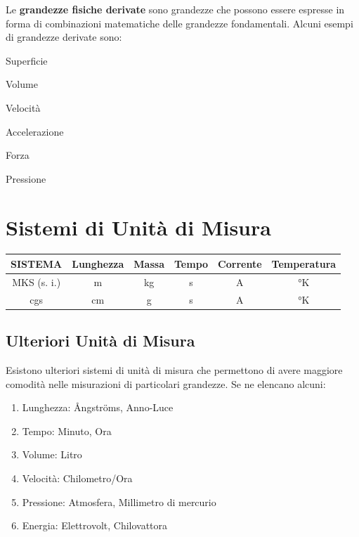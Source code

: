 \documentclass[12pt,oneside]{book}
\begin{document}
\noindent Le \textbf{grandezze fisiche derivate} sono grandezze che possono essere
espresse in forma di combinazioni matematiche delle grandezze fondamentali.
Alcuni esempi di grandezze derivate sono:
\begin{itemize}
    \begin{multicols}{2}
        \item Superficie
        \item Volume
        \item Velocità
        \item Accelerazione
        \item Forza
        \item Pressione
    \end{multicols}
\end{itemize}

\section{Sistemi di Unità di Misura}
\begin{center}
    \bgroup
    \def\arraystretch{1.5}
    \begin{tabular}{ |c| c c c c c|}
        \hline
        SISTEMA     & Lunghezza & Massa & Tempo & Corrente & Temperatura \\
        \hline
        MKS (s. i.) & m         & kg    & s     & A        & °K          \\
        \hline
        cgs         & cm        & g     & s     & A        & °K          \\
        \hline
    \end{tabular}
    \egroup
\end{center}

\subsection{Ulteriori Unità di Misura}
Esistono ulteriori sistemi di unità di misura che permettono di avere maggiore comodità
nelle misurazioni di particolari grandezze.
Se ne elencano alcuni:

\begin{enumerate}
    \item Lunghezza:    \tabto{3cm} Ångströms, Anno-Luce
    \item Tempo:        \tabto{3cm} Minuto, Ora
    \item Volume:       \tabto{3cm} Litro
    \item Velocità:     \tabto{3cm} Chilometro/Ora
    \item Pressione:    \tabto{3cm} Atmosfera, Millimetro di mercurio
    \item Energia:      \tabto{3cm} Elettrovolt, Chilovattora
\end{enumerate}
\end{document}
